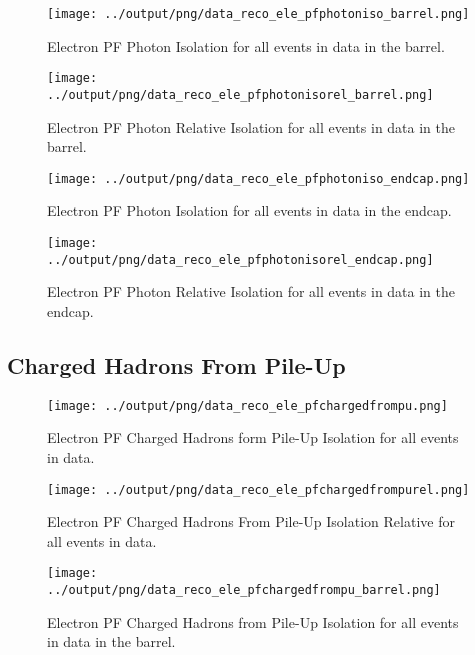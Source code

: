 \documentclass[11pt]{book}
\begin{document}
\begin{figure}[htb]
\centering
\texttt{[image: ../output/png/data\_reco\_ele\_pfphotoniso\_barrel.png]}
\caption{Electron PF Photon Isolation for all events in data in the barrel.}
\label{fig:data_ele_pfphotoniso_barrel}
\end{figure}

\begin{figure}[htb]
\centering
\texttt{[image: ../output/png/data\_reco\_ele\_pfphotonisorel\_barrel.png]}
\caption{Electron PF Photon Relative Isolation for all events in data in the barrel.}
\label{fig:data_ele_pfphotonisorel_barrel}
\end{figure}

\begin{figure}[htb]
\centering
\texttt{[image: ../output/png/data\_reco\_ele\_pfphotoniso\_endcap.png]}
\caption{Electron PF Photon Isolation for all events in data in the endcap.}
\label{fig:data_ele_pfphotoniso_endcap}
\end{figure}

\begin{figure}[htb]
\centering
\texttt{[image: ../output/png/data\_reco\_ele\_pfphotonisorel\_endcap.png]}
\caption{Electron PF Photon Relative Isolation for all events in data in the endcap.}
\label{fig:data_ele_pfphotonisorel_endcap}
\end{figure}
\clearpage

\subsection{Charged Hadrons From Pile-Up}
\begin{figure}[htb]
\centering
\texttt{[image: ../output/png/data\_reco\_ele\_pfchargedfrompu.png]}
\caption{Electron PF Charged Hadrons form Pile-Up Isolation for all events in data.}
\label{fig:data_ele_pfchargedfrompu}
\end{figure}

\begin{figure}[htb]
\centering
\texttt{[image: ../output/png/data\_reco\_ele\_pfchargedfrompurel.png]}
\caption{Electron PF Charged Hadrons From Pile-Up Isolation Relative for all events in data.}
\label{fig:data_ele_pfchargedfrompurel}
\end{figure}

\begin{figure}[htb]
\centering
\texttt{[image: ../output/png/data\_reco\_ele\_pfchargedfrompu\_barrel.png]}
\caption{Electron PF Charged Hadrons from Pile-Up Isolation for all events in data in the barrel.}
\label{fig:data_ele_pfchargedfrompu_barrel}
\end{figure}
\end{document}
